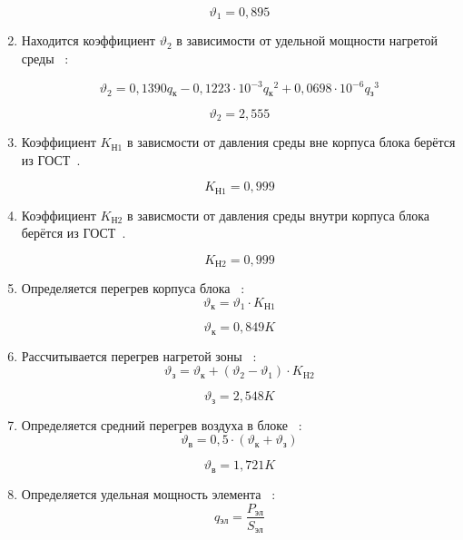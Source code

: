 \begin{enumerate}[label={\arabic*.}]
$$\vartheta_1=0,895$$

\item Находится коэффициент $\vartheta_2$ в зависимости от удельной мощности нагретой среды ~\cite{Rotkop1976}:

\begin{equation}
\vartheta_2 = 0,1390q\mathrm{_к} - 0,1223 \cdot 10^{-3}q\mathrm{_к}^2 + 0,0698 \cdot 10^{-6}q\mathrm{_з}^3
\end{equation}

$$\vartheta_2=2,555$$

\item Коэффициент $K\mathrm{_{Н1}}$ в зависмости от давления
  среды вне корпуса блока берётся из ГОСТ~\cite{GOST_15150-69}.

  $$K\mathrm{_{Н1}} = 0,999$$

  \item Коэффициент $K\mathrm{_{Н2}}$ в зависмости от давления
  среды внутри корпуса блока берётся из ГОСТ~\cite{GOST_15150-69}.

  $$K\mathrm{_{Н2}} = 0,999$$

\item Определяется перегрев корпуса блока ~\cite{Rotkop1976}:
  \begin{equation}
    \vartheta\mathrm{_к} = \vartheta_1 \cdot K\mathrm{_{Н1}}
  \end{equation}
  
  $$\vartheta\mathrm{_к} = 0,849 K$$

\item Рассчитывается перегрев нагретой зоны ~\cite{Rotkop1976}:
    \begin{equation}
    \vartheta\mathrm{_з} = \vartheta\mathrm{_к} + (\vartheta_2 - \vartheta_1) \cdot K\mathrm{_{H2}}
    \end{equation}

    $$\vartheta\mathrm{_з} = 2,548 K$$

  \item Определяется средний перегрев воздуха в блоке ~\cite{Rotkop1976}:
        \begin{equation}
      \vartheta\mathrm{_в} = 0,5 \cdot (\vartheta\mathrm{_к} + \vartheta\mathrm{_з})
    \end{equation}

    $$\vartheta\mathrm{_в} = 1,721 K$$

  \item Определяется удельная мощность элемента ~\cite{Rotkop1976}:
    \begin{equation}
      q\mathrm{_{эл}} = \frac{P_{эл}}{S_{эл}}
    \end{equation}


\end{enumerate}
